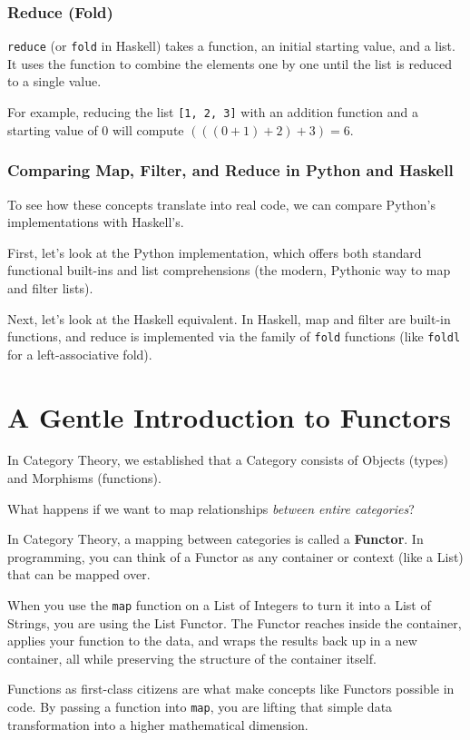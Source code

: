 \subsubsection{Reduce (Fold)}
\texttt{reduce} (or \texttt{fold} in Haskell) takes a function, an initial starting value, and a list. It uses the function to combine the elements one by one until the list is reduced to a single value.

For example, reducing the list \texttt{[1, 2, 3]} with an addition function and a starting value of $0$ will compute $(((0 + 1) + 2) + 3) = 6$.

\subsubsection{Comparing Map, Filter, and Reduce in Python and Haskell}

To see how these concepts translate into real code, we can compare Python's implementations with Haskell's. 

First, let's look at the Python implementation, which offers both standard functional built-ins and list comprehensions (the modern, Pythonic way to map and filter lists).



Next, let's look at the Haskell equivalent. In Haskell, map and filter are built-in functions, and reduce is implemented via the family of \texttt{fold} functions (like \texttt{foldl} for a left-associative fold).



\section{A Gentle Introduction to Functors}

In Category Theory, we established that a Category consists of Objects (types) and Morphisms (functions). 

What happens if we want to map relationships \textit{between entire categories}? 

In Category Theory, a mapping between categories is called a \textbf{Functor}. In programming, you can think of a Functor as any container or context (like a List) that can be mapped over. 

When you use the \texttt{map} function on a List of Integers to turn it into a List of Strings, you are using the List Functor. The Functor reaches inside the container, applies your function to the data, and wraps the results back up in a new container, all while preserving the structure of the container itself. 

Functions as first-class citizens are what make concepts like Functors possible in code. By passing a function into \texttt{map}, you are lifting that simple data transformation into a higher mathematical dimension.



